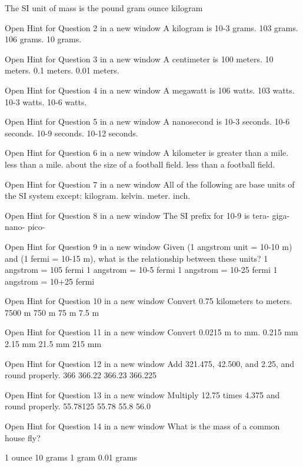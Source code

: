 

The SI unit of mass is the
    pound
    gram
    ounce
    kilogram
    
Open Hint for Question 2 in a new window    A kilogram is
    10-3 grams.
    103 grams.
    106 grams.
    10 grams.
    
Open Hint for Question 3 in a new window    A centimeter is
    100 meters.
    10 meters.
    0.1 meters.
    0.01 meters.
    
Open Hint for Question 4 in a new window    A megawatt is
    106 watts.
    103 watts.
    10-3 watts.
    10-6 watts.
    
Open Hint for Question 5 in a new window    A nanosecond is
    10-3 seconds.
    10-6 seconds.
    10-9 seconds.
    10-12 seconds.
    
Open Hint for Question 6 in a new window    A kilometer is
    greater than a mile.
    less than a mile.
    about the size of a football field.
    less than a football field.
    
Open Hint for Question 7 in a new window    All of the following are base units of the SI system except:
    kilogram.
    kelvin.
    meter.
    inch.

Open Hint for Question 8 in a new window    The SI prefix for 10-9 is
    tera-
    giga-
    nano-
    pico-
    
Open Hint for Question 9 in a new window    Given (1 angstrom unit = 10-10 m) and (1 fermi = 10-15 m), what is the relationship between these units?
    1 angstrom = 105 fermi
    1 angstrom = 10-5 fermi
    1 angstrom = 10-25 fermi
    1 angstrom = 10+25 fermi
    
Open Hint for Question 10 in a new window   Convert 0.75 kilometers to meters.
    7500 m
    750 m
    75 m
    7.5 m
    
Open Hint for Question 11 in a new window   Convert 0.0215 m to mm.
    0.215 mm
    2.15 mm
    21.5 mm
    215 mm
    
Open Hint for Question 12 in a new window   Add 321.475, 42.500, and 2.25, and round properly.
    366
    366.22
    366.23
    366.225
    
Open Hint for Question 13 in a new window   Multiply 12.75 times 4.375 and round properly.
    55.78125
    55.78
    55.8
    56.0
    
Open Hint for Question 14 in a new window   What is the mass of a common house fly?
    
    1 ounce
    10 grams
    1 gram
    0.01 grams
    

